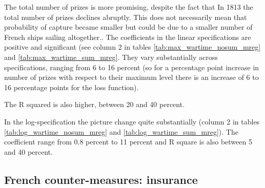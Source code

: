 \documentclass[12pt,a4paper,notitlepage,english]{article}
\begin{document}


The total number of prizes is more promising, despite the fact that In 1813 the total number of prizes declines abruptly.
This does not necessarily mean that probability of capture became smaller but could be due to a smaller number of French ships sailing altogether..
The coefficients in the linear specifications are positive and significant (see column 2 in tables  \ref{tab:max_wartime_nosum_mreg} and  \ref{tab:max_wartime_sum_mreg}.
They vary substantially across specifications, ranging from 6 to 16 percent (so for a percentage point increase in number of prizes with respect to their maximum level there is an increase of 6 to 16 percentage points for the loss function).

The R squared is also higher, between 20 and 40 percent.

In the log-specification the picture change quite substantially (column 2 in tables \ref{tab:log_wartime_nosum_mreg} and \ref{tab:log_wartime_sum_mreg}).
The coefficient range from 0.8 percent to 11 percent and R square is also between 5 and 40 percent.





 
 
 \subsection{French counter-measures: insurance}
 
\end{document}
